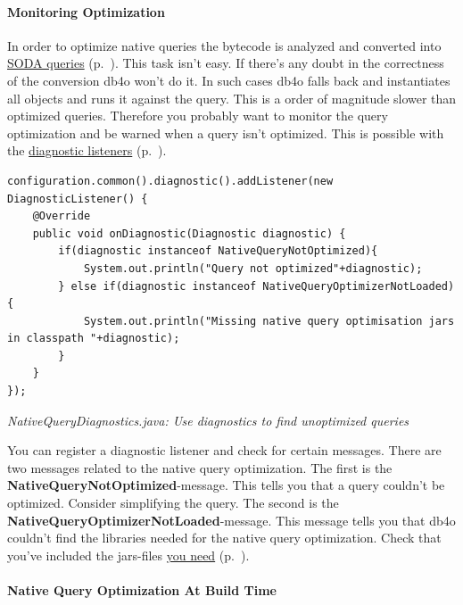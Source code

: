 \paragraph{Monitoring Optimization}
\label{ref:basics-querying-native-queries-native-query-optimization-monitoring-optimization}

In order to optimize native queries the bytecode is analyzed and converted into \hyperref[ref:basics-querying-soda-query]{SODA queries} (p.~\pageref{ref:basics-querying-soda-query}). This task isn't easy. If there's any doubt in the correctness of the conversion db4o won't do it. In such cases db4o falls back and instantiates all objects and runs it against the query. This is a order of magnitude slower than optimized queries. Therefore you probably want to monitor the query optimization and be warned when a query isn't optimized. This is possible with the \hyperref[ref:advanced-topics-diagnostics-diagnostic-messages-filter]{diagnostic listeners} (p.~\pageref{ref:advanced-topics-diagnostics-diagnostic-messages-filter}).

\begin{lstlisting}
configuration.common().diagnostic().addListener(new DiagnosticListener() {
    @Override
    public void onDiagnostic(Diagnostic diagnostic) {
        if(diagnostic instanceof NativeQueryNotOptimized){
            System.out.println("Query not optimized"+diagnostic);
        } else if(diagnostic instanceof NativeQueryOptimizerNotLoaded){
            System.out.println("Missing native query optimisation jars in classpath "+diagnostic);
        }
    }
});
\end{lstlisting}

{\small\itshape NativeQueryDiagnostics.java: Use diagnostics to find unoptimized queries\par}
\medskip

You can register a diagnostic listener and check for certain messages. There are two messages related to the native query optimization. The first is the \textbf{NativeQueryNotOptimized}-message. This tells you that a query couldn't be optimized. Consider simplifying the query. The second is the \textbf{NativeQueryOptimizerNotLoaded}-message. This message tells you that db4o couldn't find the libraries needed for the native query optimization. Check that you've included the jars-files \hyperref[ref:dependency-overview]{you need} (p.~\pageref{ref:dependency-overview}).

\paragraph{Native Query Optimization At Build Time}
\label{ref:basics-querying-native-queries-native-query-optimization-nq-build-time-optimisation}

